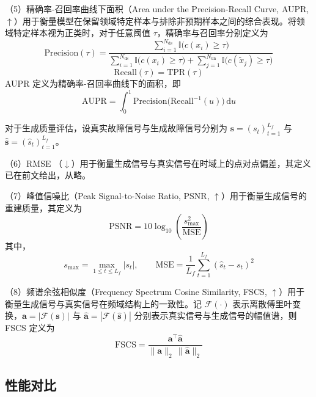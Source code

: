 （5）精确率-召回率曲线下面积（Area under the Precision-Recall Curve, AUPR, $\uparrow$）用于衡量模型在保留领域特定样本与排除非预期样本之间的综合表现。将领域特定样本视为正类时，对于任意阈值 $\tau$，精确率与召回率分别定义为
\begin{equation}
\mathrm{Precision}(\tau)
=
\frac{
\sum_{i=1}^{N_{\mathrm{ds}}}
\mathbb{I}\bigl(c(x_i)\ge \tau\bigr)
}{
\sum_{i=1}^{N_{\mathrm{ds}}}
\mathbb{I}\bigl(c(x_i)\ge \tau\bigr)
+
\sum_{j=1}^{N_{\mathrm{un}}}
\mathbb{I}\bigl(c(\tilde{x}_j)\ge \tau\bigr)
}
\end{equation}
\begin{equation}
\mathrm{Recall}(\tau)=\mathrm{TPR}(\tau)
\end{equation}
AUPR 定义为精确率-召回率曲线下的面积，即
\begin{equation}
\mathrm{AUPR}
=
\int_{0}^{1}
\mathrm{Precision}\bigl(\mathrm{Recall}^{-1}(u)\bigr)\, \mathrm{d}u
\end{equation}

对于生成质量评估，设真实故障信号与生成故障信号分别为 $\mathbf{s}=(s_t)_{t=1}^{L_f}$ 与 $\hat{\mathbf{s}}=(\hat{s}_t)_{t=1}^{L_f}$。

（6）RMSE （$\downarrow$）用于衡量生成信号与真实信号在时域上的点对点偏差，其定义已在前文给出，从略。

（7）峰值信噪比（Peak Signal-to-Noise Ratio, PSNR, $\uparrow$）用于衡量生成信号的重建质量，其定义为
\begin{equation}
\mathrm{PSNR}
=
10\log_{10}
\left(
\frac{s_{\max}^{2}}{\mathrm{MSE}}
\right)
\end{equation}
其中，
\begin{equation}
s_{\max}=\max_{1\le t\le L_f}|s_t|,
\qquad
\mathrm{MSE}
=
\frac{1}{L_f}
\sum_{t=1}^{L_f}
(\hat{s}_t-s_t)^2
\end{equation}

（8）频谱余弦相似度（Frequency Spectrum Cosine Similarity, FSCS, $\uparrow$）用于衡量生成信号与真实信号在频域结构上的一致性。记 $\mathcal{F}(\cdot)$ 表示离散傅里叶变换，$\mathbf{a}=|\mathcal{F}(\mathbf{s})|$ 与 $\hat{\mathbf{a}}=|\mathcal{F}(\hat{\mathbf{s}})|$ 分别表示真实信号与生成信号的幅值谱，则 FSCS 定义为
\begin{equation}
\mathrm{FSCS}
=
\frac{
\mathbf{a}^{\top}\hat{\mathbf{a}}
}{
\|\mathbf{a}\|_2\, \|\hat{\mathbf{a}}\|_2
}
\end{equation}

\subsection{性能对比}\label{subsec:DA-TMLLM_comparison_experiment}

